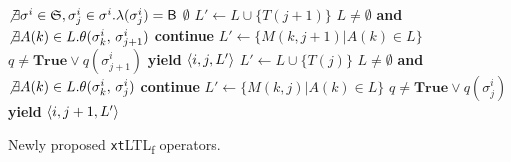 \documentclass[sigconf]{acmart}
\begin{document}
\begin{algorithm}[!t]
{\begin{minipage}{1.4\textwidth}
\begin{algorithmic}[1]
\Statex
{}
\State \algorithmicif\; $\not\exists \sigma^i\in\mathfrak{S},\sigma^i_j\in\sigma^i. \lambda(\sigma^i_j)=\textsf{B}$ \algorithmicthen\;\Return $\emptyset$\label{countScan}
\label{firstCond}
\State $L'\gets L\cup\{T(j+1)\}$
\State \algorithmicif\; $L\neq\emptyset$ \textbf{and} $\not\exists A(k)\in L. \theta(\sigma^i_k,\,\sigma^i_{j+1})$ \algorithmicthen\; \textbf{continue}
\State \algorithmicelse\; $L'\gets \{M(k,j+1)|A(k)\in L\}$\label{hasMatch1}
\EndIf
\State \algorithmicif\; $q\neq\textbf{True}\vee q(\sigma^i_{j+1})$ \algorithmicthen\; \textbf{yield} $\braket{i,j,L'}$ \label{actualReturn1}
\EndFor
\EndFunction
\Statex
{}
\State $L'\gets L\cup\{T(j)\}$
\State \algorithmicif\; $L\neq\emptyset$ \textbf{and} $\not\exists A(k)\in L. \theta(\sigma^i_k,\,\sigma^i_{j})$ \algorithmicthen\; \textbf{continue}
\State \algorithmicelse\; $L'\gets \{M(k,j)|A(k)\in L\}$
\EndIf
\State \algorithmicif\; $q\neq\textbf{True}\vee q(\sigma^i_{j})$ \algorithmicthen\; \textbf{yield} $\braket{i,j+1,L'}$
\EndFor
\EndFunction

\end{algorithmic}
		\end{minipage}%
	}%
	\endgroup


 \caption{Newly proposed \texttt{xt}LTL\textsubscript{f} operators.}\label{algo:fdgt}
\end{algorithm}
\end{document}
